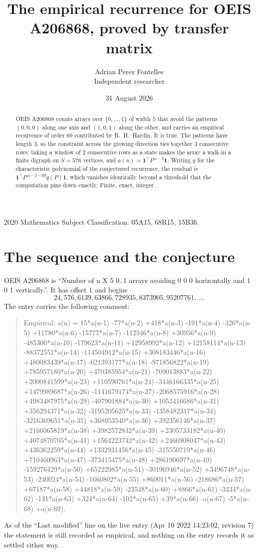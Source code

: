 \documentclass[11pt,a4paper]{article}
\title{The empirical recurrence for OEIS A206868, proved by transfer matrix}
\author{Adrian Perez Fontelles\\ \small Independent researcher}
\date{31 August 2026}
\theoremstyle{plain}
\theoremstyle{definition}
\begin{document}
\maketitle

\begin{abstract}
OEIS A206868 counts arrays over $\{0,\dots,1\}$ of width $5$ that avoid the patterns
$(0,0,0)$ along one axis and $(1,0,1)$ along the other, and carries an empirical recurrence of
order $69$ contributed by R.~H.~Hardin. It is true. The patterns have length $3$, so
the constraint across the growing direction ties together $3$ consecutive rows: taking a
window of $2$ consecutive rows as a state makes the array a walk in a finite digraph
on $S=576$ vertices, and $a(n)=\mathbf{1}^{\!\top}P^{\,n-2}\mathbf{1}$. Writing $q$
for the characteristic polynomial of the conjectured recurrence, the residual is
$\mathbf{1}^{\!\top}P^{\,n-2-69}q(P)\mathbf{1}$, which vanishes identically
beyond a threshold that the computation pins down exactly. Finite, exact, integer.
\end{abstract}

\noindent\small 2020 Mathematics Subject Classification. 05A15, 68R15, 15B36.\normalsize

\section{The sequence and the conjecture}

OEIS A206868 is ``Number of n X 5 0..1 arrays avoiding 0 0 0 horizontally and 1 0 1 vertically.''. It has offset
$1$ and begins
\[
24, 576, 6139, 63866, 728935, 8373905, 95207761,\ \dots
\]
The entry carries the following comment:
\begin{quote}\small
Empirical: a(n) = 15*a(n-1) -77*a(n-2) +418*a(n-3) -191*a(n-4) -326*a(n-5) +11780*a(n-6) -15777*a(n-7) -112546*a(n-8) +30956*a(n-9) -485300*a(n-10) -179623*a(n-11) +12958992*a(n-12) +12158114*a(n-13) -88372551*a(n-14) -114504912*a(n-15) +308183446*a(n-16) +480083439*a(n-17) -621393177*a(n-18) -971856822*a(n-19) +785957180*a(n-20) +470385954*a(n-21) -709013883*a(n-22) +2000841599*a(n-23) +110590761*a(n-24) -3446166335*a(n-25) +1479989687*a(n-26) -1141679174*a(n-27) -2068575916*a(n-28) +4983487975*a(n-29) -407901884*a(n-30) +1053416686*a(n-31) +356294371*a(n-32) -3195205625*a(n-33) -1358482317*a(n-34) -3216369651*a(n-35) +368953540*a(n-36) +392356146*a(n-37) +2166065819*a(n-38) +3982572832*a(n-39) +2305733182*a(n-40) +4074870705*a(n-41) +1564223742*a(n-42) +2466908047*a(n-43) +436362259*a(n-44) +1332931456*a(n-45) -315550719*a(n-46) +710460963*a(n-47) -373415475*a(n-48) +286190697*a(n-49) -159276429*a(n-50) +65222985*a(n-51) -30196946*a(n-52) +3496748*a(n-53) -240024*a(n-54) -1660802*a(n-55) +860011*a(n-56) -218686*a(n-57) +67187*a(n-58) +44818*a(n-59) -23548*a(n-60) +8866*a(n-61) -3434*a(n-62) -131*a(n-63) +324*a(n-64) -102*a(n-65) +39*a(n-66) -a(n-67) -5*a(n-68) +a(n-69).
\end{quote}
As of the ``Last modified'' line on the live entry (Apr 10 2022 14:23:02, revision
7) the statement is still recorded as empirical, and nothing on the entry
records it as settled either way.
\end{document}
